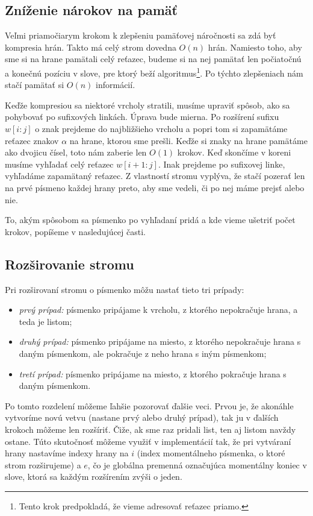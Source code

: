 \subsection{Zníženie nárokov na pamäť}

Veľmi priamočiarym krokom k zlepšeniu pamäťovej náročnosti sa zdá byť 
kompresia hrán. Takto má celý strom dovedna 
$O(n)$ hrán. Namiesto toho, aby sme si na hrane 
pamätali celý reťazec, budeme si na nej pamätať len počiatočnú a konečnú 
pozíciu v slove, pre ktorý beží algoritmus\footnote{Tento krok predpokladá, 
že vieme adresovať reťazec priamo.}. Po týchto zlepšeniach nám stačí 
pamätať si $O(n)$ informácií. 

Keďže kompresiou sa niektoré vrcholy stratili, musíme upraviť spôsob, ako sa 
pohybovať po sufixových linkách. Úprava bude mierna. Po rozšírení sufixu 
$w[i:j]$ o znak prejdeme do najbližšieho vrcholu a popri tom si zapamätáme 
reťazec znakov $\alpha$ na hrane, ktorou sme prešli. Keďže si znaky na hrane 
pamätáme ako dvojicu čísel, toto nám zaberie len $O(1)$ krokov. Keď skončíme 
v koreni musíme vyhľadať celý reťazec $w[i+1:j]$. Inak 
prejdeme po sufixovej linke, vyhľadáme zapamätaný reťazec. Z vlastností stromu 
vyplýva, že stačí pozerať len na prvé písmeno každej hrany preto, aby sme 
vedeli, či po nej máme prejsť alebo nie.

To, akým spôsobom sa písmenko po vyhľadaní pridá a kde vieme ušetriť počet 
krokov, popíšeme v nasledujúcej časti.

\subsection{Rozširovanie stromu}

Pri rozširovaní stromu o písmenko môžu nastať tieto tri prípady:
\begin{itemize}
\item \emph{prvý prípad:} písmenko pripájame k vrcholu, z ktorého nepokračuje 
hrana, a teda je listom;
\item \emph{druhý prípad:} písmenko pripájame na miesto, z ktorého nepokračuje 
hrana s daným písmenkom, ale pokračuje z neho hrana s iným písmenkom;
\item \emph{tretí prípad:} písmenko pripájame na miesto, z ktorého pokračuje 
hrana s daným písmenkom.
\end{itemize}

Po tomto rozdelení môžeme ľahšie pozorovať ďalšie veci. Prvou je, že akonáhle 
vytvoríme novú vetvu (nastane prvý alebo druhý prípad), tak ju v ďalších 
krokoch môžeme len rozšíriť. Čiže, ak sme raz pridali list, ten aj listom 
navždy ostane. Túto skutočnosť môžeme využiť v implementácií tak, že pri 
vytváraní hrany 
nastavíme indexy hrany na $i$ (index momentálneho písmenka, o ktoré strom 
rozširujeme) a $e$, čo je globálna premenná označujúca momentálny koniec v 
slove, ktorá sa každým rozšírením zvýši o jeden.

